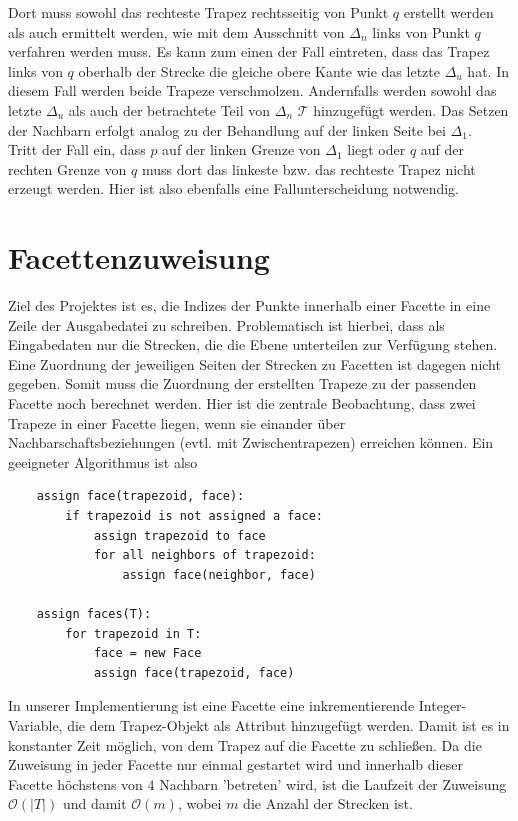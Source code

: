 \documentclass[11pt, a4paper]{article}
\newcommand{\abs}[1]{\left\lvert#1\right\rvert}
\newcommand{\T}{\ensuremath{\mathcal{T}} }
\begin{document}
Dort muss sowohl das rechteste Trapez rechtsseitig von Punkt $q$ erstellt werden als auch ermittelt werden, wie mit dem Ausschnitt von $\Delta_n$ links von Punkt $q$ verfahren werden muss. Es kann zum einen der Fall eintreten, dass das Trapez links von $q$ oberhalb der Strecke die gleiche obere Kante wie das letzte $\Delta_u$ hat. In diesem Fall werden beide Trapeze verschmolzen. Andernfalls werden sowohl das letzte $\Delta_u$ als auch der betrachtete Teil von $\Delta_n$ \T hinzugefügt werden. Das Setzen der Nachbarn erfolgt analog zu der Behandlung auf der linken Seite bei $\Delta_1$.\\
Tritt der Fall ein, dass $p$ auf der linken Grenze von $\Delta_1$ liegt oder $q$ auf der rechten Grenze von $q$ muss dort das linkeste bzw. das rechteste Trapez nicht erzeugt werden. Hier ist also ebenfalls eine Fallunterscheidung notwendig.

\section{Facettenzuweisung}
Ziel des Projektes ist es, die Indizes der Punkte innerhalb einer Facette in eine Zeile der Ausgabedatei zu schreiben. Problematisch ist hierbei, dass als Eingabedaten nur die Strecken, die die Ebene unterteilen zur Verfügung stehen. Eine Zuordnung der jeweiligen Seiten der Strecken zu Facetten ist dagegen nicht gegeben. Somit muss die Zuordnung der erstellten Trapeze zu der passenden Facette noch berechnet werden. Hier ist die zentrale Beobachtung, dass zwei Trapeze in einer Facette liegen, wenn sie einander über Nachbarschaftsbeziehungen (evtl. mit Zwischentrapezen) erreichen können. Ein geeigneter Algorithmus ist also

\begin{lstlisting}
	assign face(trapezoid, face):
		if trapezoid is not assigned a face:
			assign trapezoid to face
			for all neighbors of trapezoid:
				assign face(neighbor, face)
	
	assign faces(T):
		for trapezoid in T:
			face = new Face
			assign face(trapezoid, face)
\end{lstlisting}

In unserer Implementierung ist eine Facette eine inkrementierende Integer-Variable, die dem Trapez-Objekt als Attribut hinzugefügt werden. Damit ist es in konstanter Zeit möglich, von dem Trapez auf die Facette zu schließen. Da die Zuweisung in jeder Facette nur einmal gestartet wird und innerhalb dieser Facette höchstens von $4$ Nachbarn 'betreten' wird, ist die Laufzeit der Zuweisung $\mathcal{O}(\abs{T})$ und damit $\mathcal{O}(m)$, wobei $m$ die Anzahl der Strecken ist.
\end{document}
